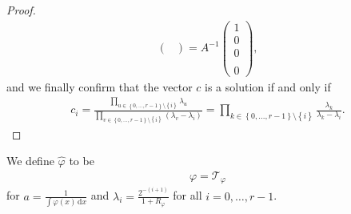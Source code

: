 \begin{proof}
\begin{align*}
\begin{pmatrix}
        \end{pmatrix}
        = A^{-1}\begin{pmatrix}
            1 \\ 0 \\ 0 \\ \\ 0
        \end{pmatrix},
    \end{align*}
    and we finally confirm that the vector \(c\) is a solution if and only if  
    \begin{align*}
        c_i = \frac{\prod\limits_{u \in \left\{ 0,...,r-1 \right\} \setminus \left\{ i \right\} }\lambda_u}{\prod\limits_{v \in \left\{ 0,...,r-1 \right\} \setminus \left\{ i \right\}} (\lambda_v - \lambda_i)} = \prod\limits_{k \in \left\{ 0,...,r-1 \right\} \setminus \left\{ i \right\}} \frac{\lambda_k}{\lambda_k - \lambda_i}.
    \end{align*}
\end{proof}

We define \(\hat \varphi\) to be 
\begin{align}\label{definition:tweakedvarphi}
    \varphi = \mathcal{T}_{\varphi}
\end{align}
for \(a = \frac{1}{\int \varphi(x) \, \mathrm{d}x}\) and \(\lambda_i = \frac{2^{-(i+1)}}{1+R_\varphi}\) for all \(i = 0,\ldots,r-1\).   
    
